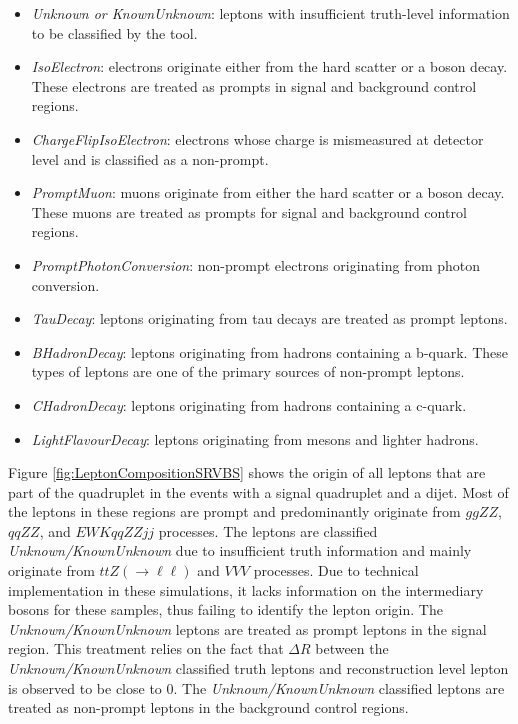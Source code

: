 \begin{itemize}
    \item{ \textit{Unknown or KnownUnknown}: leptons with insufficient truth-level information to be classified by the tool.}
 
    \item { \textit{IsoElectron}: electrons originate either from the hard scatter or a boson decay. These electrons are treated as prompts in signal and background control regions.}
    
    \item{ \textit{ChargeFlipIsoElectron}: electrons whose charge is mismeasured at detector level and is classified as a non-prompt.}
    
    \item{ \textit{PromptMuon}: muons originate from either the hard scatter or a boson decay. These muons are treated as prompts for signal and background control regions.}
    
    \item{\textit{PromptPhotonConversion}: non-prompt electrons originating from photon conversion. }
    
    \item{\textit{TauDecay}: leptons originating from tau decays are treated as prompt leptons.}
    
    \item{\textit{BHadronDecay}: leptons originating from hadrons containing a b-quark. These types of leptons are one of the primary sources of non-prompt leptons.}
    
    \item{\textit{CHadronDecay}: leptons originating from hadrons containing a c-quark.}
    
    \item{\textit{LightFlavourDecay}: leptons originating from mesons and lighter hadrons.}

\end{itemize}

Figure \ref{fig:LeptonCompositionSRVBS} shows the origin of all leptons that are part of the quadruplet in the events with a signal quadruplet and a dijet. Most of the leptons in these regions are prompt and predominantly originate from $ggZZ$, $qqZZ$, and $ EWK qqZZjj$ processes. The leptons are classified \textit{Unknown/KnownUnknown} due to insufficient truth information and mainly originate from $ttZ(\rightarrow \ell \ell)$ and $VVV$ processes. Due to technical implementation in these simulations, it lacks information on the intermediary bosons for these samples, thus failing to identify the lepton origin. The \textit{Unknown/KnownUnknown} leptons are treated as prompt leptons in the signal region. This treatment relies on the fact that $\Delta R$ between the \textit{Unknown/KnownUnknown} classified truth leptons and reconstruction level lepton is observed to be close to $0$. The \textit{Unknown/KnownUnknown} classified leptons are treated as non-prompt leptons in the background control regions. 

